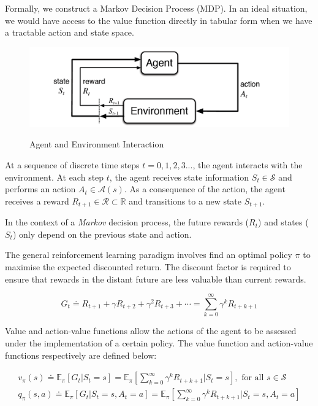 \documentclass[12pt, authoryear]{elsarticle}
\begin{document}
Formally, we construct a Markov Decision Process (MDP).
In an ideal situation, we would have access to the value function directly in tabular form when we have a tractable action and state space.

\begin{figure}[h!]
\centering
\caption{Agent and Environment Interaction}
\includegraphics[clip, angle=0, width=12cm]{figures/Loop.png}
\label{fig:1}
\end{figure}

At a sequence of discrete time steps $t = 0,1,2,3...$, the agent interacts with the environment. At each step $t$, the agent receives state information $S _ { t } \in \mathcal{S}$ and performs an action $A _ { t } \in \mathcal { A } ( s )$. As a consequence of the action, the agent receives a reward $R _ { t + 1 } \in \mathcal { R } \subset \mathbb { R }$ and transitions to a new state $S _ { t + 1 }$.

In the context of a \textit{Markov} decision process, the future rewards ($R_{t}$) and states ($S_{t}$) only depend on the previous state and action. 

The general reinforcement learning paradigm involves find an optimal policy $\pi$ to maximise the expected discounted return. The discount factor is required to ensure that rewards in the distant future are less valuable than current rewards.

$$
G _ { t } \doteq R _ { t + 1 } + \gamma R _ { t + 2 } + \gamma ^ { 2 } R _ { t + 3 } + \cdots = \sum _ { k = 0 } ^ { \infty } \gamma ^ { k } R _ { t + k + 1 }
$$

Value and action-value functions allow the actions of the agent to be assessed under the implementation of a certain policy. The value function and action-value functions respectively are defined below:

$$
\begin{aligned}
v _ { \pi } ( s ) \doteq \mathbb { E } _ { \pi } \left[ G _ { t } | S _ { t } = s \right] = \mathbb { E } _ { \pi } \left[ \sum _ { k = 0 } ^ { \infty } \gamma ^ { k } R _ { t + k + 1 } | S _ { t } = s \right] , \text { for all } s \in \mathcal{S} \\
q _ { \pi } ( s , a ) \doteq \mathbb { E } _ { \pi } \left[ G _ { t } | S _ { t } = s , A _ { t } = a \right] = \mathbb { E } _ { \pi } \left[ \sum _ { k = 0 } ^ { \infty } \gamma ^ { k } R _ { t + k + 1 } | S _ { t } = s , A _ { t } = a \right]
\end{aligned}
$$ 
\end{document}
